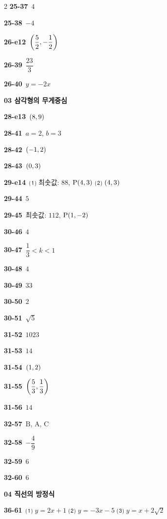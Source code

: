 \documentclass[10pt,a4paper]{article}
\newcommand{\pt}[1]{\mathrm{#1}}
\begin{document}
\begin{multicols}{2}
\noindent\textbf{25-37}\ $4$\par
\noindent\textbf{25-38}\ $-4$\par
\noindent\textbf{26-e12}\ $\left(\dfrac{5}{2}{,}\mkern3mu\mathopen{}-\dfrac{1}{2}\right)$\par
\noindent\textbf{26-39}\ $\dfrac{23}{3}$\par
\noindent\textbf{26-40}\ $y=-2x$\par
\noindent\textbf{03 삼각형의 무게중심}\par\smallskip
\noindent\textbf{28-e13}\ $(8{,}\mkern3mu\mathopen{}9)$\par
\noindent\textbf{28-41}\ $a=2$, $b=3$\par
\noindent\textbf{28-42}\ $(-1{,}\mkern3mu\mathopen{}2)$\par
\noindent\textbf{28-43}\ $(0{,}\mkern3mu\mathopen{}3)$\par
\noindent\textbf{29-e14}\ ⑴ 최솟값: $88$, $\pt{P}(4{,}\mkern3mu\mathopen{}3)$ ⑵ $(4{,}\mkern3mu\mathopen{}3)$\par
\noindent\textbf{29-44}\ $5$\par
\noindent\textbf{29-45}\ 최솟값: $112$, $\pt{P}(1{,}\mkern3mu\mathopen{}-2)$\par
\noindent\textbf{30-46}\ $4$\par
\noindent\textbf{30-47}\ $\dfrac{1}{3}<k<1$\par
\noindent\textbf{30-48}\ $4$\par
\noindent\textbf{30-49}\ $33$\par
\noindent\textbf{30-50}\ $2$\par
\noindent\textbf{30-51}\ $\sqrt{5}$\par
\noindent\textbf{31-52}\ $1023$\par
\noindent\textbf{31-53}\ $14$\par
\noindent\textbf{31-54}\ $(1{,}\mkern3mu\mathopen{}2)$\par
\noindent\textbf{31-55}\ $\left(\dfrac{5}{3}{,}\mkern3mu\mathopen{}\dfrac{1}{3}\right)$\par
\noindent\textbf{31-56}\ $14$\par
\noindent\textbf{32-57}\ $\pt{B}$, $\pt{A}$, $\pt{C}$\par
\noindent\textbf{32-58}\ $-\dfrac{4}{9}$\par
\noindent\textbf{32-59}\ $6$\par
\noindent\textbf{32-60}\ $6$\par
\noindent\textbf{04 직선의 방정식}\par\smallskip
\noindent\textbf{36-61}\ ⑴ $y=2x+1$ ⑵ $y=-3x-5$ ⑶ $y=x+2\sqrt{2}$\par

\end{multicols}
\end{document}
